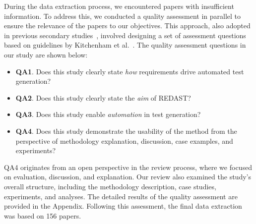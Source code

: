 During the data extraction process, we encountered papers with insufficient information. To address this, we conducted a quality assessment in parallel to ensure the relevance of the papers to our objectives. This approach, also adopted in previous secondary studies~\cite{shamsujjoha2021developing, naveed2024model}, involved designing a set of assessment questions based on guidelines by Kitchenham et al.~\cite{kitchenham2022segress}. The quality assessment questions in our study are shown below:
\begin{itemize}
    \item \textbf{QA1}. Does this study clearly state \emph{how} requirements drive automated test generation?
    \item \textbf{QA2}. Does this study clearly state the \emph{aim} of REDAST?
    \item \textbf{QA3}. Does this study enable \emph{automation} in test generation?
    \item \textbf{QA4}. Does this study demonstrate the usability of the method from the perspective of methodology explanation, discussion, case examples, and experiments?
\end{itemize}
QA4 originates from an open perspective in the review process, where we focused on evaluation, discussion, and explanation. Our review also examined the study’s overall structure, including the methodology description, case studies, experiments, and analyses. The detailed results of the quality assessment are provided in the Appendix. Following this assessment, the final data extraction was based on 156 papers.


